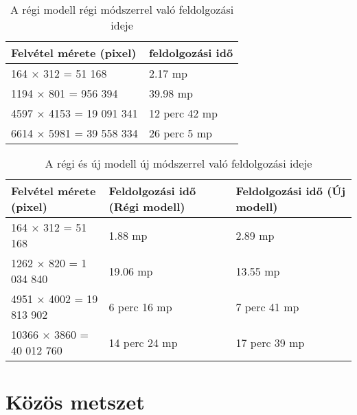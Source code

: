 \begin{table}[H]
	\centering
	\begin{tabular}{ | p{} | p{} | }
		\hline
		\textbf{Felvétel mérete (pixel)} & \textbf{feldolgozási idő} \\
		\hline \hline
		164 × 312 = 51 168  & 2.17 mp  \\
		\hline
		1194 × 801 = 956 394 & 39.98 mp\\
		\hline
		4597 × 4153 = 19 091 341 & 12 perc 42 mp \\
		\hline
        6614 × 5981 = 39 558 334 & 26 perc 5 mp  \\
		\hline
	\end{tabular}
	\caption{A régi modell régi módszerrel való feldolgozási ideje}
	\label{tab:old-speed}
\end{table}

\begin{table}[H]
	\centering
	\begin{tabular}{ | p{} | p{} | p{} | }
		\hline
		\textbf{Felvétel mérete (pixel)} & \textbf{Feldolgozási idő (Régi modell)} & \textbf{Feldolgozási idő (Új modell)} \\
		\hline \hline
		164 × 312 = 51 168  & 1.88 mp &  2.89 mp \\
		\hline
		1262 × 820 = 1 034 840 & 19.06 mp & 13.55 mp \\
		\hline
		4951 × 4002 = 19 813 902 & 6 perc 16 mp & 7 perc 41 mp \\
		\hline
        10366 × 3860 = 40 012 760 & 14 perc 24 mp & 17 perc 39 mp \\
		\hline
	\end{tabular}
	\caption{A régi és új modell új módszerrel való feldolgozási ideje}
	\label{tab:new-speed}
\end{table}

\section{Közös metszet}
\label{ch:intersection}

